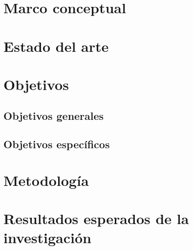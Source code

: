 \documentclass[12pt]{article}
\begin{document}
\section{Marco conceptual}


\section{Estado del arte}

\section{Objetivos}

\subsection{Objetivos generales} 

\subsection{Objetivos específicos}

\section{Metodolog\'ia}

\section{Resultados esperados de la investigaci\'on}
\end{document}
